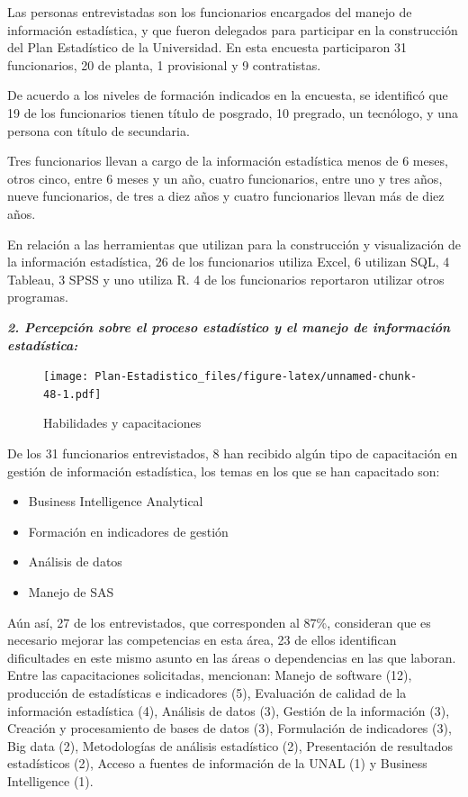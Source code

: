 \documentclass[
]{book}
\providecommand{\tightlist}{%
  \setlength{\itemsep}{0pt}\setlength{\parskip}{0pt}}
\begin{document}
Las personas entrevistadas son los funcionarios encargados del manejo de información estadística,
y que fueron delegados para participar en la construcción del Plan Estadístico de la Universidad. En
esta encuesta participaron 31 funcionarios, 20 de planta, 1 provisional y 9 contratistas.

De acuerdo a los niveles de formación indicados en la encuesta, se identificó que 19 de los
funcionarios tienen título de posgrado, 10 pregrado, un tecnólogo, y una persona con título de
secundaria.

Tres funcionarios llevan a cargo de la información estadística menos de 6 meses, otros cinco, entre 6
meses y un año, cuatro funcionarios, entre uno y tres años, nueve funcionarios, de tres a diez años y cuatro funcionarios llevan más de diez años.

En relación a las herramientas que utilizan para la construcción y visualización de la información
estadística, 26 de los funcionarios utiliza Excel, 6 utilizan SQL, 4 Tableau, 3 SPSS y uno utiliza R. 4 de
los funcionarios reportaron utilizar otros programas.

\textbf{\emph{2. Percepción sobre el proceso estadístico y el manejo de información estadística:}}

\begin{figure}
\centering
\texttt{[image: Plan-Estadistico\_files/figure-latex/unnamed-chunk-48-1.pdf]}
\caption{\label{fig:unnamed-chunk-48}Habilidades y capacitaciones}
\end{figure}

De los 31 funcionarios entrevistados, 8 han recibido algún tipo de capacitación en gestión de información estadística, los temas en los que se han capacitado son:

\begin{itemize}
\tightlist
\item
  Business Intelligence Analytical
\item
  Formación en indicadores de gestión
\item
  Análisis de datos
\item
  Manejo de SAS
\end{itemize}

Aún así, 27 de los entrevistados, que corresponden al 87\%, consideran que es necesario mejorar las competencias en esta área, 23 de ellos identifican dificultades en este mismo asunto en las áreas o dependencias en las que laboran. Entre las capacitaciones solicitadas, mencionan: Manejo de software (12), producción de estadísticas e indicadores (5), Evaluación de calidad de la información estadística (4), Análisis de datos (3), Gestión de la información (3), Creación y procesamiento de bases de datos (3), Formulación de indicadores (3), Big data (2), Metodologías de análisis estadístico (2), Presentación de resultados estadísticos (2), Acceso a fuentes de información de la UNAL (1) y Business Intelligence (1).
\end{document}
